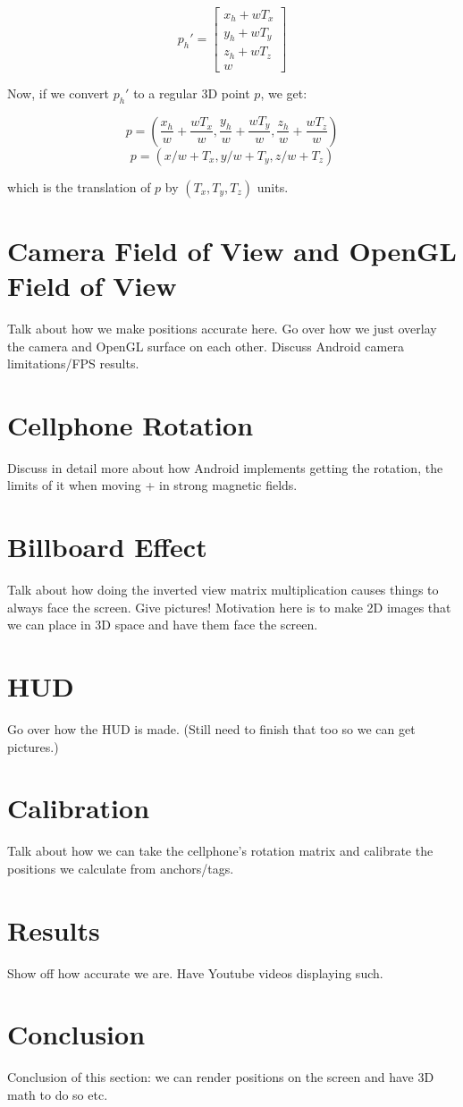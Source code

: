 \[
 p_{h}\prime = \begin{bmatrix}
 x_h + w T_x \\
 y_h + w T_y \\
 z_h + w T_z \\
 w
 \end{bmatrix}
 \]
 
 Now, if we convert $p_{h}\prime$ to a regular 3D point $p$, we get:
 
 \[ p = (\frac{x_h}{w} + \frac{w T_x}{w},  \frac{y_h}{w} + \frac{w T_y}{w}, \frac{z_h}{w} + \frac{w T_z}{w}) \]
 \[ p = (x/w + T_x, y/w + T_y, z/w + T_z) \]
 
 which is the translation of $p$ by $(T_x, T_y, T_z)$ units.

\section{Camera Field of View and OpenGL Field of View}
Talk about how we make positions accurate here. Go over how we just overlay the camera and OpenGL surface on each other. Discuss Android camera limitations/FPS results.

\section{Cellphone Rotation}
Discuss in detail more about how Android implements getting the rotation, the limits of it when moving + in strong magnetic fields.

\section{Billboard Effect}
Talk about how doing the inverted view matrix multiplication causes things to always face the screen. Give pictures! Motivation here is to make 2D images that we can place in 3D space and have them face the screen.

\section{HUD}
Go over how the HUD is made. (Still need to finish that too so we can get pictures.)

\section{Calibration}
Talk about how we can take the cellphone's rotation matrix and calibrate the positions we calculate from anchors/tags.

\section{Results}
Show off how accurate we are. Have Youtube videos displaying such.

\section{Conclusion}
Conclusion of this section: we can render positions on the screen and have 3D math to do so etc.
